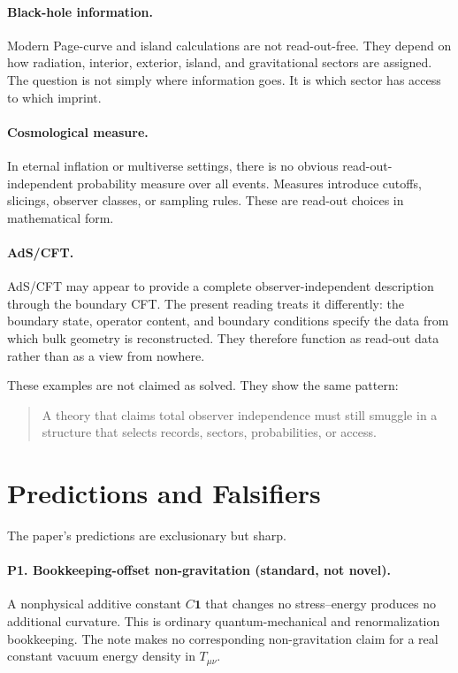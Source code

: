 \documentclass[12pt,a4paper]{article}
\theoremstyle{definition}
\theoremstyle{remark}
\begin{document}
\paragraph{Black-hole information.}
Modern Page-curve and island calculations are not read-out-free. They depend on how radiation, interior, exterior, island, and gravitational sectors are assigned. The question is not simply where information goes. It is which sector has access to which imprint.

\paragraph{Cosmological measure.}
In eternal inflation or multiverse settings, there is no obvious read-out-independent probability measure over all events. Measures introduce cutoffs, slicings, observer classes, or sampling rules. These are read-out choices in mathematical form.

\paragraph{AdS/CFT.}
AdS/CFT may appear to provide a complete observer-independent description through the boundary CFT. The present reading treats it differently: the boundary state, operator content, and boundary conditions specify the data from which bulk geometry is reconstructed. They therefore function as read-out data rather than as a view from nowhere.

These examples are not claimed as solved. They show the same pattern:

\begin{quote}
A theory that claims total observer independence must still smuggle in a structure that selects records, sectors, probabilities, or access.
\end{quote}

\section{Predictions and Falsifiers}
\label{sec:predictions}

The paper's predictions are exclusionary but sharp.

\paragraph{P1. Bookkeeping-offset non-gravitation (standard, not novel).}
A nonphysical additive constant $C\mathbf1$ that changes no stress--energy produces no additional curvature.  This is ordinary quantum-mechanical and renormalization bookkeeping.  The note makes no corresponding non-gravitation claim for a real constant vacuum energy density in $T_{\mu\nu}$.
\end{document}

